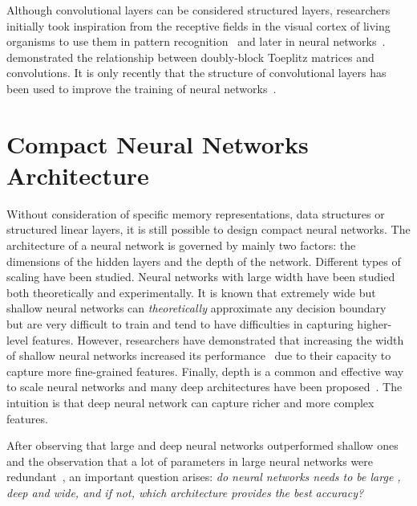 Although convolutional layers can be considered structured layers, researchers initially took inspiration from the receptive fields in the visual cortex of living organisms to use them in pattern recognition~\cite{hubel1959receptive,hubel1968receptive} and later in neural networks~\cite{fukushima1982neocognitron}.
\citet{jain1989fundamentals} demonstrated the relationship between doubly-block Toeplitz matrices and convolutions.
It is only recently that the structure of convolutional layers has been used to improve the training of neural networks~\cite{sedghi2018singular}.


\section{Compact Neural Networks Architecture}
\label{section:p1-ch3-compact_neural_networks_architecture}


Without consideration of specific memory representations, data structures or structured linear layers, it is still possible to design compact neural networks.
The architecture of a neural network is governed by mainly two factors: the dimensions of the hidden layers and the depth of the network.
Different types of scaling have been studied.
Neural networks with large width have been studied both theoretically and experimentally.
It is known that extremely wide but shallow neural networks can \emph{theoretically} approximate any decision boundary~\cite{cybenko1989approximation} but are very difficult to train and tend to have difficulties in capturing higher-level features. 
However, researchers have demonstrated that increasing the width of shallow neural networks increased its performance~\cite{howard2017mobilenets,sandler2018mobilenetv2,tan2019mnasnet,zagoruyko2016wide} due to their capacity to capture more fine-grained features. 
Finally, depth is a common and effective way to scale neural networks and many deep architectures have been proposed~\cite{he2016deep, huang2016deep, szegedy2016rethinking,szegedy2017inception,xiao2018dynamical}. 
The intuition is that deep neural network can capture richer and more complex features.

After observing that large and deep neural networks outperformed shallow ones \cite{huang2019gpipe,brown2020language} and the observation that a lot of parameters in large neural networks were redundant~\cite{dai2018compressing,frankle2018lottery}, an important question arises: \emph{do neural networks needs to be large \ie, deep and wide, and if not, which architecture provides the best accuracy?} 


